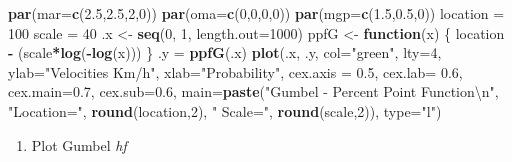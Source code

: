 \documentclass[12pt,oneside]{reedthesis}
\newenvironment{Shaded}{\begin{snugshade}}{\end{snugshade}}
\newcommand{\CharTok}[1]{\textcolor[rgb]{0.31,0.60,0.02}{#1}}
\newcommand{\ControlFlowTok}[1]{\textcolor[rgb]{0.13,0.29,0.53}{\textbf{#1}}}
\newcommand{\DataTypeTok}[1]{\textcolor[rgb]{0.13,0.29,0.53}{#1}}
\newcommand{\DecValTok}[1]{\textcolor[rgb]{0.00,0.00,0.81}{#1}}
\newcommand{\FloatTok}[1]{\textcolor[rgb]{0.00,0.00,0.81}{#1}}
\newcommand{\KeywordTok}[1]{\textcolor[rgb]{0.13,0.29,0.53}{\textbf{#1}}}
\newcommand{\NormalTok}[1]{#1}
\newcommand{\OperatorTok}[1]{\textcolor[rgb]{0.81,0.36,0.00}{\textbf{#1}}}
\newcommand{\StringTok}[1]{\textcolor[rgb]{0.31,0.60,0.02}{#1}}
\providecommand{\tightlist}{%
  \setlength{\itemsep}{0pt}\setlength{\parskip}{0pt}}
\begin{document}
\begin{Shaded}
\begin{Highlighting}[]
\KeywordTok{par}\NormalTok{(}\DataTypeTok{mar=}\KeywordTok{c}\NormalTok{(}\FloatTok{2.5}\NormalTok{,}\FloatTok{2.5}\NormalTok{,}\DecValTok{2}\NormalTok{,}\DecValTok{0}\NormalTok{))}
\KeywordTok{par}\NormalTok{(}\DataTypeTok{oma=}\KeywordTok{c}\NormalTok{(}\DecValTok{0}\NormalTok{,}\DecValTok{0}\NormalTok{,}\DecValTok{0}\NormalTok{,}\DecValTok{0}\NormalTok{))}
\KeywordTok{par}\NormalTok{(}\DataTypeTok{mgp=}\KeywordTok{c}\NormalTok{(}\FloatTok{1.5}\NormalTok{,}\FloatTok{0.5}\NormalTok{,}\DecValTok{0}\NormalTok{))}
\NormalTok{location =}\StringTok{ }\DecValTok{100}
\NormalTok{scale =}\StringTok{ }\DecValTok{40}
\NormalTok{.x <-}\StringTok{ }\KeywordTok{seq}\NormalTok{(}\DecValTok{0}\NormalTok{, }\DecValTok{1}\NormalTok{, }\DataTypeTok{length.out=}\DecValTok{1000}\NormalTok{)}
\NormalTok{ppfG <-}\StringTok{ }\ControlFlowTok{function}\NormalTok{(x) \{}
\NormalTok{  location }\OperatorTok{-}\StringTok{ }\NormalTok{(scale}\OperatorTok{*}\KeywordTok{log}\NormalTok{(}\OperatorTok{-}\KeywordTok{log}\NormalTok{(x)))}
\NormalTok{  \}}
\NormalTok{.y =}\StringTok{ }\KeywordTok{ppfG}\NormalTok{(.x)}
\KeywordTok{plot}\NormalTok{(.x, .y, }\DataTypeTok{col=}\StringTok{"green"}\NormalTok{, }\DataTypeTok{lty=}\DecValTok{4}\NormalTok{, }\DataTypeTok{ylab=}\StringTok{"Velocities Km/h"}\NormalTok{, }\DataTypeTok{xlab=}\StringTok{"Probability"}\NormalTok{, }\DataTypeTok{cex.axis =} \FloatTok{0.5}\NormalTok{, }\DataTypeTok{cex.lab=} \FloatTok{0.6}\NormalTok{, }\DataTypeTok{cex.main=}\FloatTok{0.7}\NormalTok{, }\DataTypeTok{cex.sub=}\FloatTok{0.6}\NormalTok{,}
 \DataTypeTok{main=}\KeywordTok{paste}\NormalTok{(}\StringTok{"Gumbel - Percent Point Function}\CharTok{\textbackslash{}n}\StringTok{"}\NormalTok{, }\StringTok{"Location="}\NormalTok{, }\KeywordTok{round}\NormalTok{(location,}\DecValTok{2}\NormalTok{), }\StringTok{" Scale="}\NormalTok{, }\KeywordTok{round}\NormalTok{(scale,}\DecValTok{2}\NormalTok{)), }\DataTypeTok{type=}\StringTok{"l"}\NormalTok{)}
\end{Highlighting}
\end{Shaded}
\normalsize
\begin{enumerate}
\def\labelenumi{\arabic{enumi}.}
\setcounter{enumi}{4}
\tightlist
\item
  Plot Gumbel \emph{hf}
\end{enumerate}
\tiny
\end{document}
